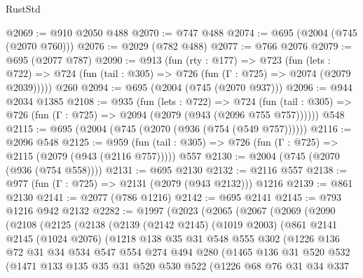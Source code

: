 \begin{lexlean}{RustStd}
\begin{coremodule}
{\begin{coremodule}
{{{{{{{{{@2069 := @910 @2050 @488
@2070 := @747 @488
@2074 := @695 (@2004 (@745 (@2070 @760)))
@2076 := @2029 (@782 @488)
@2077 := @766 @2076
@2079 := @695 (@2077 @787)
@2090 := @913
    (fun (rty : @177) =>
    @723
      (fun (lets : @722) =>
      @724 (fun (tail : @305) => @726 (fun (Γ : @725) => @2074 (@2079 @2039)))))
    @260
@2094 := @695 (@2004 (@745 (@2070 @937)))
@2096 := @944 @2034 @1385
@2108 := @935
    (fun (lets : @722) =>
    @724 (fun (tail : @305) => @726 (fun (Γ : @725) => @2094 (@2079 (@943 (@2096 @755 @757))))))
    @548
@2115 := @695 (@2004 (@745 (@2070 (@936 (@754 (@549 @757))))))
@2116 := @2096 @548
@2125 := @959 (fun (tail : @305) => @726 (fun (Γ : @725) => @2115 (@2079 (@943 (@2116 @757))))) @557
@2130 := @2004 (@745 (@2070 (@936 (@754 @558))))
@2131 := @695 @2130
@2132 := @2116 @557
@2138 := @977 (fun (Γ : @725) => @2131 (@2079 (@943 @2132))) @1216
@2139 := @861 @2130
@2141 := @2077 (@786 @1216)
@2142 := @695 @2141
@2145 := @793 @1216 @942 @2132
@2282 := @1997
    (@2023
      (@2065
        (@2067
          (@2069
            (@2090
              (@2108
                (@2125
                  (@2138
                    (@2139
                      (@2142 @2145)
                      (@1019 @2003)
                      (@861
                        @2141
                        @2145
                        (@1024 @2076)
                        (@1218
                          @138
                          @35
                          @31
                          @548
                          @555
                          @302
                          (@1226
                            @136
                            @72
                            @31
                            @34
                            @534
                            @547
                            @554
                            @274
                            @494
                            @280
                            (@1465
                              @136
                              @31
                              @520
                              @532
                              (@1471
                                @133
                                @135
                                @35
                                @31
                                @520
                                @530
                                @522
                                (@1226
                                  @68
                                  @76
                                  @31
                                  @34
                                  @337
}}}}}}}}}
\end{coremodule}}
\end{coremodule}
\end{lexlean}
